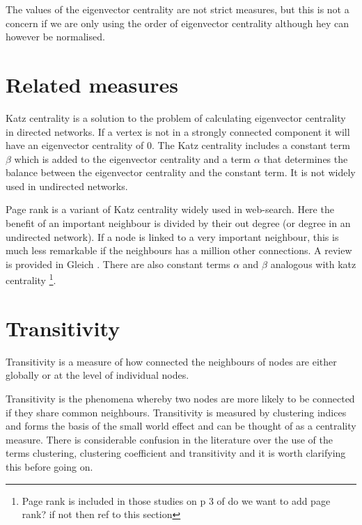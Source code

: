    The values of the eigenvector centrality are not strict measures, but this is not a concern if we are only using the order of eigenvector centrality although hey can however be normalised. 
  
 \section{Related measures}
\label{sec:related centrality measures}
Katz centrality is a solution to the problem of calculating eigenvector centrality in directed networks. If a vertex is not in a strongly connected component it will have an eigenvector centrality of 0. The Katz centrality includes a constant term $\beta$ which is added to the eigenvector centrality and a term $\alpha$ that determines the balance between the eigenvector centrality and the constant term. It is not widely used in undirected networks.\cite{newman2018networks} 

Page rank is a variant of Katz centrality widely used in web-search. Here the benefit of an important neighbour is divided by their out degree (or degree in an undirected network). If a node is linked to a very important neighbour, this is much less remarkable if the neighbours has a million other connections. A review is provided in Gleich \cite{gleich2015pagerank}. There are also constant terms $\alpha$ and $\beta$ analogous with katz centrality\cite{newman2018networks} \footnote{Page rank is included in those studies on p 3 of \cite{kardos2020stability} do we want to add page rank? if not then ref to this section}.
    
 





\section{Transitivity}
\label{sec:transitivity}
Transitivity is a measure of how connected the neighbours of nodes are either globally or at the level of individual nodes. 

Transitivity is the phenomena whereby two nodes are more likely to be connected if they share common neighbours. Transitivity is measured by clustering indices and forms the basis of the small world effect and can be thought of as a centrality measure. There is considerable confusion in the literature over the use of the terms clustering, clustering coefficient and transitivity and it is worth clarifying this before going on. 

